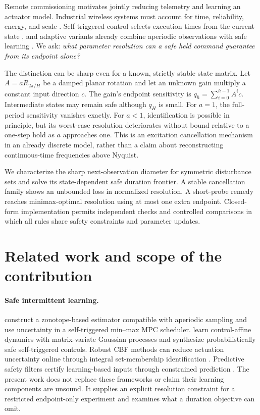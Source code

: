\documentclass{l4dc2026}
\begin{document}
Remote commissioning motivates jointly reducing telemetry and learning an actuator model. Industrial wireless systems must account for time, reliability, energy, and scale \citep{nist}. Self-triggered control selects execution times from the current state \citep{anta2010}, and adaptive variants already combine aperiodic observations with safe learning \citep{zhang2019,dhiman2022}. We ask: \emph{what parameter resolution can a safe held command guarantee from its endpoint alone?}

The distinction can be sharp even for a known, strictly stable state matrix. Let $A=aR_{2\pi/H}$ be a damped planar rotation and let an unknown gain multiply a constant input direction $c$. The gain's endpoint sensitivity is $q_h=\sum_{i=0}^{h-1}A^i c$. Intermediate states may remain safe although $q_H$ is small. For $a=1$, the full-period sensitivity vanishes exactly. For $a<1$, identification is possible in principle, but its worst-case resolution deteriorates without bound relative to a one-step hold as $a$ approaches one. This is an excitation cancellation mechanism in an already discrete model, rather than a claim about reconstructing continuous-time frequencies above Nyquist.

We characterize the sharp next-observation diameter for symmetric disturbance sets and solve its state-dependent safe duration frontier. A stable cancellation family shows an unbounded loss in normalized resolution. A short-probe remedy reaches minimax-optimal resolution using at most one extra endpoint. Closed-form implementation permits independent checks and controlled comparisons in which all rules share safety constraints and parameter updates.

\section{Related work and scope of the contribution}
\paragraph{Safe intermittent learning.}
\citet{zhang2019} construct a zonotope-based estimator compatible with aperiodic sampling and use uncertainty in a self-triggered min--max MPC scheduler. \citet{dhiman2022} learn control-affine dynamics with matrix-variate Gaussian processes and synthesize probabilistically safe self-triggered controls. Robust CBF methods can reduce actuation uncertainty online through integral set-membership identification \citep{cohen2022}. Predictive safety filters certify learning-based inputs through constrained prediction \citep{wabersich2021}. The present work does not replace these frameworks or claim their learning components are unsound. It supplies an explicit resolution constraint for a restricted endpoint-only experiment and examines what a duration objective can omit.
\end{document}
